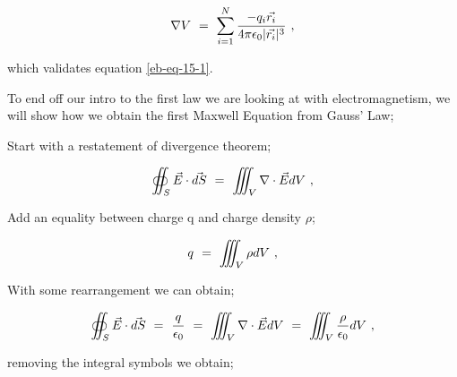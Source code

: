 \documentclass{article}
\begin{document}
\begin{equation} \label{eb-eq-23-1}
\nabla{V} \hspace{0.125cm} = \hspace{0.125cm} \sum_{i=1}^{N} \frac{-q_{i}\vec{r_{i}}}{4\pi \epsilon_0 |\vec{r_{i}}|^{3}} \hspace{0.125cm} , 
\end{equation}

which validates equation \ref{eb-eq-15-1}. 

To end off our intro to the first law we are looking at with electromagnetism, we will show how we obtain the first Maxwell Equation from Gauss' Law;

Start with a restatement of divergence theorem; 

\begin{equation} \label{eb-eq-24-1}
\oiint_S \vec{E}\cdot\vec{dS} \hspace{0.125cm} = \hspace{0.125cm}
\iiint_V \nabla\cdot\vec{E}dV \hspace{0.125cm} , 
\end{equation} 

Add an equality between charge q and charge density \begin{math} \rho \end{math}; 

\begin{equation} \label{eb-eq-25-1}
q \hspace{0.125cm} = \hspace{0.125cm} \iiint_V \rho dV \hspace{0.125cm} , 
\end{equation} 

With some rearrangement we can obtain;

\begin{equation} \label{eb-eq-26-1}
\oiint_S \vec{E}\cdot\vec{dS} \hspace{0.125cm} = \hspace{0.125cm} \frac{q}{\epsilon_0} \hspace{0.125cm} = \hspace{0.125cm} \iiint_V \nabla\cdot\vec{E}dV \hspace{0.125cm} = \hspace{0.125cm} \iiint_V \frac{\rho}{\epsilon_{0}}dV \hspace{0.125cm} , 
\end{equation}

removing the integral symbols we obtain;
\end{document}
